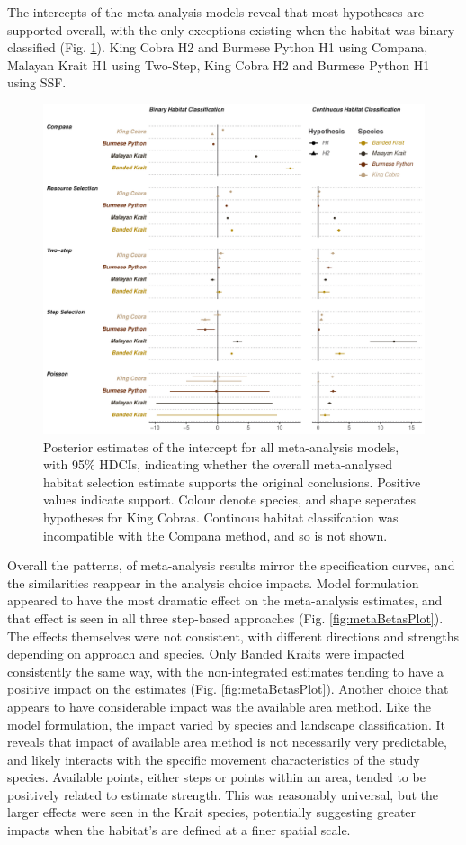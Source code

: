 \documentclass[10pt,a4paper]{article}
\begin{document}
The intercepts of the meta-analysis models reveal that most hypotheses are supported overall, with the only exceptions existing when the habitat was binary classified (Fig. \ref{fig:metaInterPlot}).
King Cobra H2 and Burmese Python H1 using Compana, Malayan Krait H1 using Two-Step, King Cobra H2 and Burmese Python H1 using SSF.

\begin{figure}
\includegraphics[width=1\linewidth]{../../figures/metaIntercept} \caption{Posterior estimates of the intercept for all meta-analysis models, with 95\% HDCIs, indicating whether the overall meta-analysed habitat selection estimate supports the original conclusions. Positive values indicate support. Colour denote species, and shape seperates hypotheses for King Cobras. Continous habitat classifcation was incompatible with the Compana method, and so is not shown.}\label{fig:metaInterPlot}
\end{figure}

Overall the patterns, of meta-analysis results mirror the specification curves, and the similarities reappear in the analysis choice impacts.
Model formulation appeared to have the most dramatic effect on the meta-analysis estimates, and that effect is seen in all three step-based approaches (Fig. \ref{fig:metaBetasPlot}).
The effects themselves were not consistent, with different directions and strengths depending on approach and species.
Only Banded Kraits were impacted consistently the same way, with the non-integrated estimates tending to have a positive impact on the estimates (Fig. \ref{fig:metaBetasPlot}).
Another choice that appears to have considerable impact was the available area method.
Like the model formulation, the impact varied by species and landscape classification.
It reveals that impact of available area method is not necessarily very predictable, and likely interacts with the specific movement characteristics of the study species.
Available points, either steps or points within an area, tended to be positively related to estimate strength.
This was reasonably universal, but the larger effects were seen in the Krait species, potentially suggesting greater impacts when the habitat's are defined at a finer spatial scale.
\end{document}

